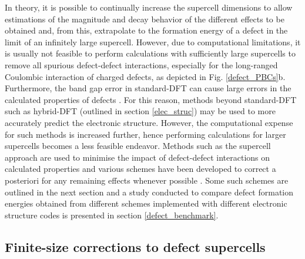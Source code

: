 \documentclass[11pt, twoside]{report}
\begin{document}
In theory, it is possible to continually increase the supercell dimensions to allow estimations of the magnitude and decay behavior of the different effects to be obtained and, from this, extrapolate to the formation energy of a defect in the limit of an infinitely large supercell.
However, due to computational limitations, it is usually not feasible to perform calculations with sufficiently large supercells to remove all spurious defect-defect interactions, especially for the long-ranged Coulombic interaction of charged defects, as depicted in Fig. \ref{defect_PBCs}b.
Furthermore, the band gap error in standard-DFT can cause large errors in the calculated properties of defects \cite{Lany_defects}. For this reason, methods beyond standard-DFT such as hybrid-DFT (outlined in section \ref{elec_struc}) may be used to more accurately predict the electronic structure. However, the computational expense for such methods is increased further, hence performing calculations for larger supercells becomes a less feasible endeavor.
Methods such as the supercell approach are used to minimise the impact of defect-defect interactions on calculated properties and various schemes have been developed to correct a posteriori for any remaining effects whenever possible \cite{freysoldt_rev}. Some such schemes are outlined in the next section and a study conducted to compare defect formation energies obtained from different schemes implemented with different electronic structure codes is presented in section \ref{defect_benchmark}.

\subsection{Finite-size corrections to defect supercells}
\end{document}
